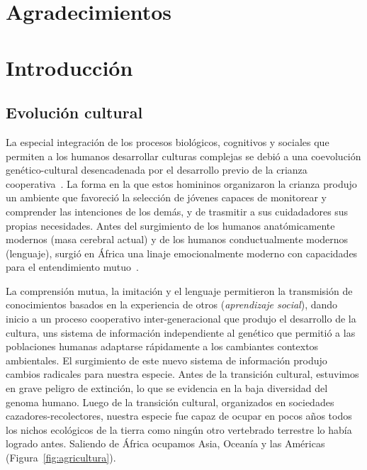 \documentclass[a4paper,10pt]{book}
\makeatletter
\renewcommand{\mainmatter}{\cleardoublepage\@mainmattertrue}
\theoremstyle{definition}
\makeatother
\begin{document}

\chapter{Agradecimientos}

\mainmatter


\chapter{Introducción} \label{ch:evo}

\section{Evolución cultural}

La especial integraci\'on de los procesos biol\'ogicos, cognitivos y sociales que permiten a los humanos desarrollar culturas complejas se debi\'o a una coevoluci\'on gen\'etico-cultural desencadenada por el desarrollo previo de la crianza cooperativa~\cite{hrdy2020-emotionallyModern}.
%
La forma en la que estos homininos organizaron la crianza produjo un ambiente que favoreci\'o la selecci\'on de j\'ovenes capaces de monitorear y comprender las intenciones de los dem\'as, y de trasmitir a sus cuidadadores sus propias necesidades.
Antes del surgimiento de los humanos anat\'omicamente modernos (masa cerebral actual) y de los humanos conductualmente modernos (lenguaje), surgi\'o en África una linaje emocionalmente moderno con capacidades para el entendimiento mutuo~\cite{hrdy2020-emotionallyModern}.


La comprensi\'on mutua, la imitaci\'on y el lenguaje permitieron la transmisi\'on de conocimientos basados en la experiencia de otros (\emph{aprendizaje social}), dando inicio a un proceso cooperativo inter-generacional que produjo el desarrollo de la cultura, uns sistema de informaci\'on independiente al gen\'etico que permiti\'o a las poblaciones humanas adaptarse r\'apidamente a los cambiantes contextos ambientales.
%
El surgimiento de este nuevo sistema de informaci\'on produjo cambios radicales para nuestra especie.
%
Antes de la transici\'on cultural, estuvimos en grave peligro de extinci\'on, lo que se evidencia en la baja diversidad del genoma humano.
%
Luego de la transici\'on cultural, organizados en sociedades cazadores-recolectores, nuestra especie fue capaz de ocupar en pocos a\~nos todos los nichos ecol\'ogicos de la tierra como ning\'un otro vertebrado terrestre lo hab\'ia logrado antes.
%
Saliendo de África ocupamos Asia, Ocean\'ia y las Am\'ericas (Figura~\ref{fig:agricultura}).
\end{document}
